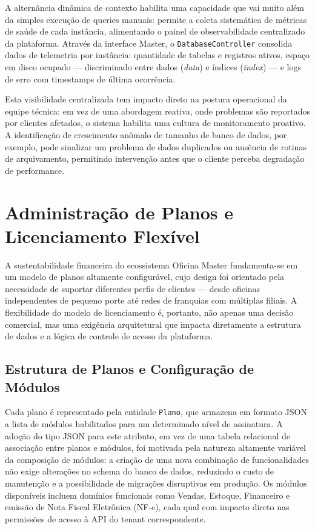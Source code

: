 A alternância dinâmica de contexto habilita uma capacidade que vai muito além
da simples execução de queries manuais: permite a coleta sistemática de métricas
de saúde de cada instância, alimentando o painel de observabilidade centralizado
da plataforma. Através da interface Master, o \texttt{DatabaseController}
consolida dados de telemetria por instância: quantidade de tabelas e registros
ativos, espaço em disco ocupado --- discriminado entre dados (\textit{data}) e
índices (\textit{index}) --- e logs de erro com timestamps de última ocorrência.

Esta visibilidade centralizada tem impacto direto na postura operacional da
equipe técnica: em vez de uma abordagem reativa, onde problemas são reportados
por clientes afetados, o sistema habilita uma cultura de monitoramento proativo.
A identificação de crescimento anômalo de tamanho de banco de dados, por exemplo,
pode sinalizar um problema de dados duplicados ou ausência de rotinas de
arquivamento, permitindo intervenção antes que o cliente perceba degradação de
performance.


\section{Administração de Planos e Licenciamento Flexível}

A sustentabilidade financeira do ecossistema Oficina Master fundamenta-se em
um modelo de planos altamente configurável, cujo design foi orientado pela
necessidade de suportar diferentes perfis de clientes --- desde oficinas
independentes de pequeno porte até redes de franquias com múltiplas filiais.
A flexibilidade do modelo de licenciamento é, portanto, não apenas uma decisão
comercial, mas uma exigência arquitetural que impacta diretamente a estrutura
de dados e a lógica de controle de acesso da plataforma.

\subsection{Estrutura de Planos e Configuração de Módulos}

Cada plano é representado pela entidade \texttt{Plano}, que armazena em formato
JSON a lista de módulos habilitados para um determinado nível de assinatura.
A adoção do tipo JSON para este atributo, em vez de uma tabela relacional de
associação entre planos e módulos, foi motivada pela natureza altamente variável
da composição de módulos: a criação de uma nova combinação de funcionalidades
não exige alterações no schema do banco de dados, reduzindo o custo de
manutenção e a possibilidade de migrações disruptivas em produção. Os módulos
disponíveis incluem domínios funcionais como Vendas, Estoque, Financeiro e
emissão de Nota Fiscal Eletrônica (NF-e), cada qual com impacto direto nas
permissões de acesso à API do tenant correspondente.

